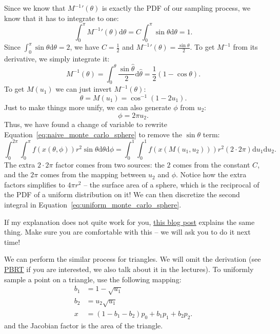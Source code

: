 Since we know that ${M^{-1}}'(\theta)$ is exactly the PDF of our sampling process, we know that it has to integrate to one:
\begin{equation}
\int_{0}^{\pi} {M^{-1}}'(\theta) \mathrm{d}\theta = C\int_{0}^{\pi} \sin\theta \mathrm{d}\theta = 1.
\end{equation}
Since $\int_{0}^{\pi} \sin\theta \mathrm{d}\theta = 2$, we have $C = \frac{1}{2}$ and ${M^{-1}}'(\theta) = \frac{\sin\theta}{2}$. To get $M^{-1}$ from its derivative, we simply integrate it:
\begin{equation}
M^{-1}(\theta) = \int_{0}^{\theta} \frac{\sin\hat{\theta}}{2} \mathrm{d}\hat{\theta} = \frac{1}{2}\left(1 - \cos\theta\right).
\end{equation}
To get $M(u_1)$ we can just invert $M^{-1}(\theta)$:
\begin{equation}
\theta = M(u_1) = \cos^{-1}\left(1 - 2u_1\right).
\end{equation}
Just to make things more unify, we can also generate $\phi$ from $u_2$:
\begin{equation}
\phi = 2\pi u_2.
\end{equation}
Thus, we have found a change of variable to rewrite Equation~\eqref{eq:naive_monte_carlo_sphere} to remove the $\sin\theta$ term:
\begin{equation}
	\int_{0}^{2\pi}\int_{0}^{\pi} f(x(\theta, \phi)) r^2 \sin\theta \mathrm{d}\theta \mathrm{d} \phi =
	\int_{0}^{1}\int_{0}^{1} f(x(M(u_1, u_2))) r^2 (2 \cdot 2\pi) \mathrm{d}u_1 \mathrm{d}u_2.
	\label{eq:uniform_monte_carlo_sphere}
\end{equation}
The extra $2 \cdot 2\pi$ factor comes from two sources: the $2$ comes from the constant $C$, and the $2\pi$ comes from the mapping between $u_2$ and $\phi$. Notice how the extra factors simplifies to $4\pi r^2$ -- the surface area of a sphere, which is the reciprocal of the PDF of a uniform distribution on it! We can then discretize the second integral in Equation~\eqref{eq:uniform_monte_carlo_sphere}.

If my explanation does not quite work for you, \href{http://6degreesoffreedom.co/circle-random-sampling/}{this blog post} explains the same thing. Make sure you are comfortable with this -- we will ask you to do it next time!

We can perform the similar process for triangles. We will omit the derivation (see \href{https://www.pbr-book.org/3ed-2018/Monte_Carlo_Integration/2D_Sampling_with_Multidimensional_Transformations#SamplingaTriangle}{PBRT} if you are interested, we also talk about it in the lectures). To uniformly sample a point on a triangle, use the following mapping:
\begin{equation}
\begin{aligned}
b_1 &= 1 - \sqrt{u_1} \\
b_2 &= u_2 \sqrt{u_1} \\
x &= (1 - b_1 - b_2) p_0 + b_1 p_1 + b_2 p_2.
\end{aligned}
\end{equation}
and the Jacobian factor is the area of the triangle.

